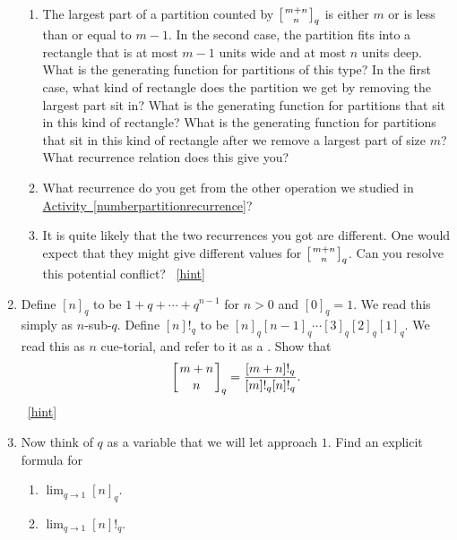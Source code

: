 \documentclass{book}
\begin{document}
\begin{activity}[]
\begin{enumerate}[font=\bfseries,label=(\alph*),ref=\alph*]
\begin{enumerate}[font=\bfseries,label=(\roman*),ref=\theenumi.\roman*]
\item\label{task-287} \hypertarget{p-1678}{}%
The largest part of a partition counted by \(\left[{m+n\atop n}\right]_q\) is either \(m\) or is less than or equal to \(m-1\).  In the second case, the partition fits into a rectangle that is at most \(m-1\) units wide and at most \(n\) units deep.  What is the generating function for partitions of this type?  In the first case, what kind of rectangle does the partition we get by removing the largest part sit in?  What is the generating function for partitions that sit in this kind of rectangle?  What is the generating function for partitions that sit in this kind of rectangle after we remove a largest part of size \(m\)?  What recurrence relation does this give you?%
\item\label{task-288} \hypertarget{p-1682}{}%
What recurrence do you get from the other operation we studied in \hyperref[numberpartitionrecurrence]{Activity~\ref{numberpartitionrecurrence}}?%
\item\label{task-289} \hypertarget{p-1684}{}%
It is quite likely that the two recurrences you got are different.  One would expect that they might give different values for \(\left[{m+n\atop n}\right]_q\).  Can you resolve this potential conflict?%
~\hfill{\tiny\hyperlink{a-327.e.iii}{[hint]}\hypertarget{q-327.e.iii}{}}\end{enumerate}
\item\label{task-290} \hypertarget{p-1687}{}%
Define \([n]_q\) to be \(1+q+\cdots+q^{n-1}\) for \(n>0\) and \([0]_q =1\).  We read this simply as \(n\)-sub-\(q\). Define \([n]!_q\) to be \([n]_q[n-1]_q\cdots [3]_q[2]_q[1]_q\). We read this as \(n\) cue-torial, and refer to it as a . Show that%
\begin{equation*}
\left[{m+n\atop n}\right]_q = \frac{[m+n]!_q}{[m]!_q[n]!_q}.
\end{equation*}
%
~\hfill{\tiny\hyperlink{a-327.f}{[hint]}\hypertarget{q-327.f}{}}\item\label{task-291} \hypertarget{p-1691}{}%
Now think of \(q\) as a variable that we will let approach \(1\). Find an explicit formula for \leavevmode%
\begin{enumerate}[label=(\roman*)]
\item\hypertarget{li-62}{}\(\displaystyle\lim_{q\rightarrow 1} [n]_q\).%
\item\hypertarget{li-63}{}\(\displaystyle\lim_{q\rightarrow 1} [n]!_q\).%

\end{enumerate}
\end{enumerate}
\end{activity}
\end{document}
